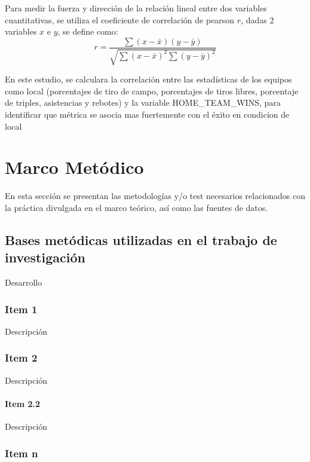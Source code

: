 \documentclass[oneside,11pt]{Latex/Classes/PhDthesisPSnPDF}
\begin{document}
Para medir la fuerza y dirección de la relación lineal entre dos
variables cuantitativas, se utiliza el coeficiente de correlación de
pearson \(r\), dadas 2 variables \(x\) e \(y\), se define como:
\[ r =  \frac{\sum(x - \bar{x})(y - \bar{y})}{\sqrt{\sum(x - \bar{x})^2 \sum (y - \bar{y})^2}} \]

En este estudio, se calculara la correlación entre las estadísticas de
los equipos como local (porcentajes de tiro de campo, porcentajes de
tiros libres, porcentaje de triples, asistencias y rebotes) y la
variable HOME\_TEAM\_WINS, para identificar que métrica se asocia mas
fuertemente con el éxito en condicion de local

\chapter{Marco Metódico}

En esta sección se presentan las metodologías y/o test necesarios
relacionados con la práctica divulgada en el marco teórico, así como las
fuentes de datos.

\section{Bases metódicas utilizadas en el trabajo de investigación}

Desarrollo\\

\subsection{Item 1}

Descripción\\

\subsection{Item 2}

Descripción\\

\subsubsection{Item 2.2}

Descripción\\

\subsection{Item n}
\end{document}
